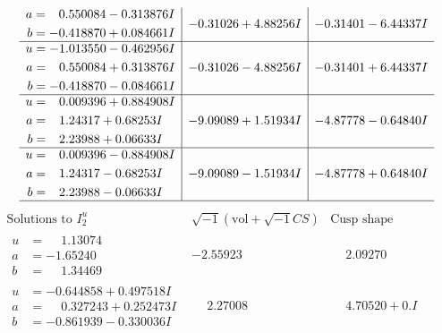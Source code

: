 \documentclass[1p]{elsarticle_modified}
\theoremstyle{definition}
\newcommand{\I}{\sqrt{-1}}
\begin{document}
$$\begin{array}{c|c|c}
\begin{aligned}
a &= \phantom{-}0.550084 - 0.313876 I \\
b &= -0.418870 + 0.084661 I\end{aligned}
 & -0.31026 + 4.88256 I & -0.31401 - 6.44337 I \\ \hline\begin{aligned}
u &= -1.013550 - 0.462956 I \\
a &= \phantom{-}0.550084 + 0.313876 I \\
b &= -0.418870 - 0.084661 I\end{aligned}
 & -0.31026 - 4.88256 I & -0.31401 + 6.44337 I \\ \hline\begin{aligned}
u &= \phantom{-}0.009396 + 0.884908 I \\
a &= \phantom{-}1.24317 + 0.68253 I \\
b &= \phantom{-}2.23988 + 0.06633 I\end{aligned}
 & -9.09089 + 1.51934 I & -4.87778 - 0.64840 I \\ \hline\begin{aligned}
u &= \phantom{-}0.009396 - 0.884908 I \\
a &= \phantom{-}1.24317 - 0.68253 I \\
b &= \phantom{-}2.23988 - 0.06633 I\end{aligned}
 & -9.09089 - 1.51934 I & -4.87778 + 0.64840 I\\
 \hline 
 \end{array}$$\newpage$$\begin{array}{c|c|c}  
\text{Solutions to }I^u_{2}& \I (\text{vol} + \sqrt{-1}CS) & \text{Cusp shape}\\
 \hline 
\begin{aligned}
u &= \phantom{-}1.13074\phantom{ +0.000000I} \\
a &= -1.65240\phantom{ +0.000000I} \\
b &= \phantom{-}1.34469\phantom{ +0.000000I}\end{aligned}
 & -2.55923\phantom{ +0.000000I} & \phantom{-}2.09270\phantom{ +0.000000I} \\ \hline\begin{aligned}
u &= -0.644858 + 0.497518 I \\
a &= \phantom{-}0.327243 + 0.252473 I \\
b &= -0.861939 - 0.330036 I\end{aligned}
 & \phantom{-}2.27008\phantom{ +0.000000I} & \phantom{-}4.70520 + 0. I\phantom{ +0.000000I} \\ \hline\begin{aligned}

\end{aligned}
\end{array}$$
\end{document}
